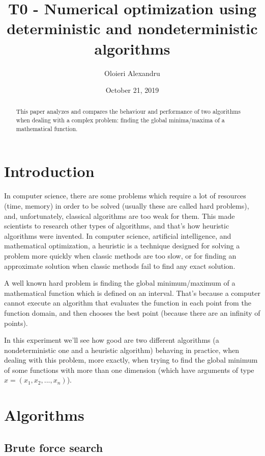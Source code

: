 \documentclass{article}
\title{T0 - Numerical optimization using deterministic and nondeterministic algorithms}
\author{Oloieri Alexandru}
\date{October 21, 2019}
\begin{document}
	
\maketitle
	
\begin{abstract}
	\centering
	This paper analyzes and compares the behaviour and performance of two algorithms when dealing with a complex problem: finding the global minima/maxima of a mathematical function.
\end{abstract}
	
\section{Introduction}

In computer science, there are some problems which require a lot of resources (time, memory) in order to be solved (usually these are called hard problems), and, unfortunately, classical algorithms are too weak for them. This made scientists to research other types of algorithms, and that's how heuristic algorithms were invented. In computer science, artificial intelligence, and mathematical optimization, a heuristic is a technique designed for solving a problem more quickly when classic methods are too slow, or for finding an approximate solution when classic methods fail to find any exact solution.

A well known hard problem is finding the global minimum/maximum of a mathematical function which is defined on an interval. That's because a computer cannot execute an algorithm that evaluates the function in each point from the function domain, and then chooses the best point (because there are an infinity of points).

In this experiment we'll see how good are two different algorithms (a nondeterministic one and a heuristic algorithm) behaving in practice, when dealing with this problem, more exactly, when trying to find the global minimum of some functions with more than one dimension (which have arguments of type $x = (x_1,x_2,...,x_n)$).

\section{Algorithms}

\subsection{Brute force search}
\end{document}
